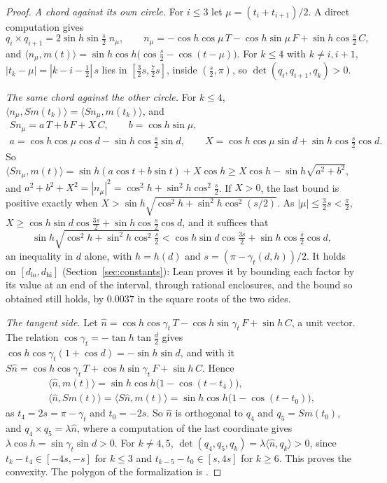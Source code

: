 \documentclass[12pt]{amsart}
\theoremstyle{definition}
\theoremstyle{plain}
\theoremstyle{definition}
\newcommand{\dlo}{d_{\mathrm{lo}}}
\newcommand{\dhi}{d_{\mathrm{hi}}}
\begin{document}
\begin{proof}
\emph{A chord against its own circle.} For $i\le3$ let $\mu=(t_i+t_{i+1})/2$. A direct computation gives
\[
q_i\times q_{i+1}=2\sin h\sin\tfrac s2\;n_\mu,\qquad n_\mu=-\cos h\cos\mu\,T-\cos h\sin\mu\,F+\sin h\cos\tfrac s2\,C,
\]
and $\langle n_\mu,m(t)\rangle=\sin h\cos h\bigl(\cos\frac s2-\cos(t-\mu)\bigr)$. For $k\le4$ with $k\ne i,i+1$, $|t_k-\mu|=|k-i-\frac12|\,s$ lies in $[\frac32s,\frac72s]$, inside $(\frac s2,\pi)$, so $\det(q_i,q_{i+1},q_k)>0$.

\emph{The same chord against the other circle.} For $k\le4$, $\langle n_\mu,Sm(t_k)\rangle=\langle Sn_\mu,m(t_k)\rangle$, and
\begin{gather*}
Sn_\mu=a\,T+b\,F+X\,C,\qquad b=\cos h\sin\mu,\\
a=\cos h\cos\mu\cos d-\sin h\cos\tfrac s2\sin d,\qquad X=\cos h\cos\mu\sin d+\sin h\cos\tfrac s2\cos d .
\end{gather*}
So $\langle Sn_\mu,m(t)\rangle=\sin h(a\cos t+b\sin t)+X\cos h\ge X\cos h-\sin h\sqrt{a^2+b^2}$, and $a^2+b^2+X^2=|n_\mu|^2=\cos^2h+\sin^2h\cos^2\frac s2$. If $X>0$, the last bound is positive exactly when $X>\sin h\sqrt{\cos^2h+\sin^2h\cos^2(s/2)}$. As $|\mu|\le\frac32s<\frac\pi2$, $X\ge\cos h\sin d\cos\frac{3s}2+\sin h\cos\frac s2\cos d$, and it suffices that
\[
\sin h\sqrt{\cos^2h+\sin^2h\cos^2\tfrac s2}<\cos h\sin d\cos\tfrac{3s}2+\sin h\cos\tfrac s2\cos d ,
\]
an inequality in $d$ alone, with $h=h(d)$ and $s=(\pi-\gamma_t(d,h))/2$. It holds on $[\dlo,\dhi]$ (Section~\ref{sec:constants}): Lean proves it by bounding each factor by its value at an end of the interval, through rational enclosures, and the bound so obtained still holds, by $0.0037$ in the square roots of the two sides.

\emph{The tangent side.} Let $\hat n=\cos h\cos\gamma_t\,T-\cos h\sin\gamma_t\,F+\sin h\,C$, a unit vector. The relation $\cos\gamma_t=-\tan h\tan\frac d2$ gives $\cos h\cos\gamma_t(1+\cos d)=-\sin h\sin d$, and with it $S\hat n=\cos h\cos\gamma_t\,T+\cos h\sin\gamma_t\,F+\sin h\,C$. Hence
\begin{gather*}
\langle\hat n,m(t)\rangle=\sin h\cos h\bigl(1-\cos(t-t_4)\bigr),\\
\langle\hat n,Sm(t)\rangle=\langle S\hat n,m(t)\rangle=\sin h\cos h\bigl(1-\cos(t-t_0)\bigr),
\end{gather*}
as $t_4=2s=\pi-\gamma_t$ and $t_0=-2s$. So $\hat n$ is orthogonal to $q_4$ and $q_5=Sm(t_0)$, and $q_4\times q_5=\lambda\hat n$, where a computation of the last coordinate gives $\lambda\cos h=\sin\gamma_t\sin d>0$. For $k\ne4,5$, $\det(q_4,q_5,q_k)=\lambda\langle\hat n,q_k\rangle>0$, since $t_k-t_4\in[-4s,-s]$ for $k\le3$ and $t_{k-5}-t_0\in[s,4s]$ for $k\ge6$. This proves the convexity. The polygon of the formalization is .
\end{proof}
\end{document}
